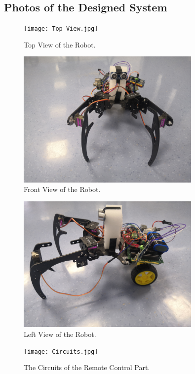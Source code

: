 \documentclass[a4paper]{article}
\begin{document}
\subsection{Photos of the Designed System}
\begin{figure}[H]
    \centering
    \texttt{[image: Top View.jpg]}
    \caption{Top View of the Robot.}
\end{figure}
\begin{figure}[H]
    \centering
    \includegraphics[width=0.8\textwidth]{Front View.jpg}
    \caption{Front View of the Robot.}
\end{figure}
\begin{figure}[H]
    \centering
    \includegraphics[width=0.8\textwidth]{Left View.jpg}
    \caption{Left View of the Robot.}
\end{figure}
\begin{figure}[H]
    \centering
    \texttt{[image: Circuits.jpg]}
    \caption{The Circuits of the Remote Control Part.}
\end{figure}
\end{document}
